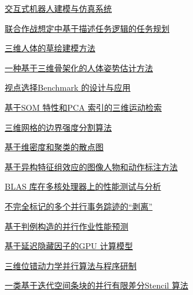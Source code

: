\documentclass[a4paper]{article}
\begin{document}
\href{http://www.jos.org.cn/ch/reader/download_pdf.aspx?file_no=10014&year_id=2010&quarter_id=zk&falg=1}{交互式机器人建模与仿真系统}

\href{http://www.jos.org.cn/ch/reader/download_pdf.aspx?file_no=10015&year_id=2010&quarter_id=zk&falg=1}{联合作战想定中基于描述任务逻辑的任务规划}

\href{http://www.jos.org.cn/ch/reader/download_pdf.aspx?file_no=10016&year_id=2010&quarter_id=zk&falg=1}{三维人体的草绘建模方法}

\href{http://www.jos.org.cn/ch/reader/download_pdf.aspx?file_no=10017&year_id=2010&quarter_id=zk&falg=1}{一种基于三维骨架化的人体姿势估计方法}

\href{http://www.jos.org.cn/ch/reader/download_pdf.aspx?file_no=10018&year_id=2010&quarter_id=zk&falg=1}{视点选择Benchmark 的设计与应用}

\href{http://www.jos.org.cn/ch/reader/download_pdf.aspx?file_no=10019&year_id=2010&quarter_id=zk&falg=1}{基于SOM 特性和PCA 索引的三维运动检索}

\href{http://www.jos.org.cn/ch/reader/download_pdf.aspx?file_no=10020&year_id=2010&quarter_id=zk&falg=1}{三维网格的边界强度分割算法}

\href{http://www.jos.org.cn/ch/reader/download_pdf.aspx?file_no=10021&year_id=2010&quarter_id=zk&falg=1}{基于维密度和聚类的散点图}

\href{http://www.jos.org.cn/ch/reader/download_pdf.aspx?file_no=10022&year_id=2010&quarter_id=zk&falg=1}{基于异构特征组效应的图像人物和动作标注方法}

\href{http://www.jos.org.cn/ch/reader/download_pdf.aspx?file_no=10023&year_id=2010&quarter_id=zk&falg=1}{BLAS 库在多核处理器上的性能测试与分析}

\href{http://www.jos.org.cn/ch/reader/download_pdf.aspx?file_no=10024&year_id=2010&quarter_id=zk&falg=1}{不完全标记的多个并行事务踪迹的“剥离”}

\href{http://www.jos.org.cn/ch/reader/download_pdf.aspx?file_no=10025&year_id=2010&quarter_id=zk&falg=1}{基于判例构造的并行作业性能预测}

\href{http://www.jos.org.cn/ch/reader/download_pdf.aspx?file_no=10026&year_id=2010&quarter_id=zk&falg=1}{基于延迟隐藏因子的GPU 计算模型}

\href{http://www.jos.org.cn/ch/reader/download_pdf.aspx?file_no=10027&year_id=2010&quarter_id=zk&falg=1}{三维位错动力学并行算法与程序研制}

\href{http://www.jos.org.cn/ch/reader/download_pdf.aspx?file_no=10028&year_id=2010&quarter_id=zk&falg=1}{一类基于迭代空间条块的并行有限差分Stencil 算法}
\end{document}
